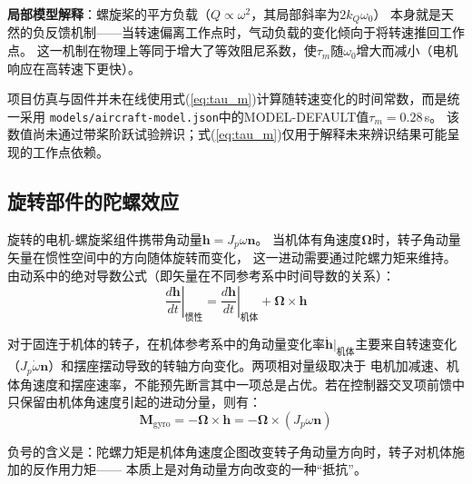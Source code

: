 \textbf{局部模型解释}：螺旋桨的平方负载（$Q \propto \omega^2$，其局部斜率为$2 k_Q \omega_0$）
本身就是天然的负反馈机制——当转速偏离工作点时，气动负载的变化倾向于将转速推回工作点。
这一机制在物理上等同于增大了等效阻尼系数，使$\tau_m$随$\omega_0$增大而减小（电机响应在高转速下更快）。

项目仿真与固件并未在线使用式(\ref{eq:tau_m})计算随转速变化的时间常数，而是统一采用
\texttt{models/aircraft-model.json}中的MODEL-DEFAULT值$\tau_m=0.28$\,s。
该数值尚未通过带桨阶跃试验辨识；式(\ref{eq:tau_m})仅用于解释未来辨识结果可能呈现的工作点依赖。

\subsection{旋转部件的陀螺效应}

旋转的电机-螺旋桨组件携带角动量$\bm{h} = J_p \omega \bm{n}$。
当机体有角速度$\bm{\Omega}$时，转子角动量矢量在惯性空间中的方向随体旋转而变化，
这一进动需要通过陀螺力矩来维持。由动系中的绝对导数公式（即矢量在不同参考系中时间导数的关系）：
\begin{equation}
    \left. \frac{d\bm{h}}{dt} \right|_{\text{惯性}}
    = \left. \frac{d\bm{h}}{dt} \right|_{\text{机体}}
    + \bm{\Omega} \times \bm{h}
    \label{eq:absolute_derivative}
\end{equation}

对于固连于机体的转子，在机体参考系中的角动量变化率$\dot{\bm{h}}|_{\text{机体}}$主要来自转速变化
（$J_p \dot{\omega} \bm{n}$）和摆座摆动导致的转轴方向变化。两项相对量级取决于
电机加减速、机体角速度和摆座速率，不能预先断言其中一项总是占优。若在控制器交叉项前馈中
只保留由机体角速度引起的进动分量，则有：
\begin{equation}
    \boxed{\bm{M}_{\text{gyro}} = -\bm{\Omega} \times \bm{h}
           = -\bm{\Omega} \times (J_p \omega \bm{n})}
    \label{eq:gyro_moment}
\end{equation}

负号的含义是：陀螺力矩是机体角速度企图改变转子角动量方向时，转子对机体施加的反作用力矩——
本质上是对角动量方向改变的一种“抵抗”。

